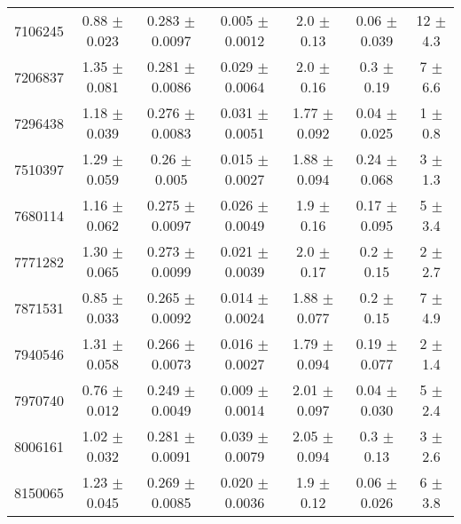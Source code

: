 \begin{table*}
\begin{tabular}{c|cccccc}
7106245  &        0.88   $\pm$  0.023    &        0.283  $\pm$  0.0097   &        0.005  $\pm$  0.0012   &        2.0    $\pm$  0.13     &        0.06   $\pm$  0.039    &       12      $\pm$  4.3      \\
7206837  &        1.35   $\pm$  0.081    &        0.281  $\pm$  0.0086   &        0.029  $\pm$  0.0064   &        2.0    $\pm$  0.16     &        0.3    $\pm$  0.19     &        7      $\pm$  6.6      \\
7296438  &        1.18   $\pm$  0.039    &        0.276  $\pm$  0.0083   &        0.031  $\pm$  0.0051   &        1.77   $\pm$  0.092    &        0.04   $\pm$  0.025    &        1      $\pm$  0.8      \\
7510397  &        1.29   $\pm$  0.059    &        0.26   $\pm$  0.005    &        0.015  $\pm$  0.0027   &        1.88   $\pm$  0.094    &        0.24   $\pm$  0.068    &        3      $\pm$  1.3      \\
7680114  &        1.16   $\pm$  0.062    &        0.275  $\pm$  0.0097   &        0.026  $\pm$  0.0049   &        1.9    $\pm$  0.16     &        0.17   $\pm$  0.095    &        5      $\pm$  3.4      \\
7771282  &        1.30   $\pm$  0.065    &        0.273  $\pm$  0.0099   &        0.021  $\pm$  0.0039   &        2.0    $\pm$  0.17     &        0.2    $\pm$  0.15     &        2      $\pm$  2.7      \\
7871531  &        0.85   $\pm$  0.033    &        0.265  $\pm$  0.0092   &        0.014  $\pm$  0.0024   &        1.88   $\pm$  0.077    &        0.2    $\pm$  0.15     &        7      $\pm$  4.9      \\
7940546  &        1.31   $\pm$  0.058    &        0.266  $\pm$  0.0073   &        0.016  $\pm$  0.0027   &        1.79   $\pm$  0.094    &        0.19   $\pm$  0.077    &        2      $\pm$  1.4      \\
7970740  &        0.76   $\pm$  0.012    &        0.249  $\pm$  0.0049   &        0.009  $\pm$  0.0014   &        2.01   $\pm$  0.097    &        0.04   $\pm$  0.030    &        5      $\pm$  2.4      \\
8006161  &        1.02   $\pm$  0.032    &        0.281  $\pm$  0.0091   &        0.039  $\pm$  0.0079   &        2.05   $\pm$  0.094    &        0.3    $\pm$  0.13     &        3      $\pm$  2.6      \\
8150065  &        1.23   $\pm$  0.045    &        0.269  $\pm$  0.0085   &        0.020  $\pm$  0.0036   &        1.9    $\pm$  0.12     &        0.06   $\pm$  0.026    &        6      $\pm$  3.8      \\

\end{tabular}
\end{table*}
